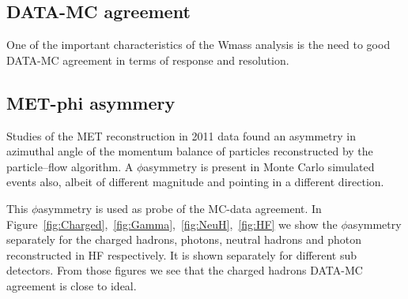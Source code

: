 \subsection{DATA-MC agreement}

One of the important characteristics of the Wmass analysis is the need to good DATA-MC agreement in terms of response and resolution.

\subsection{MET-phi asymmery}
Studies of the MET reconstruction in 2011 data found an asymmetry in azimuthal angle of the
 momentum balance of particles reconstructed by the particle–flow algorithm.
A $\phi$\–asymmetry is present in Monte Carlo simulated events also,
albeit of different magnitude and pointing in a different direction.

This $\phi$\–asymmetry is used as probe of the MC-data agreement.
In Figure~\ref{fig:Charged},~\ref{fig:Gamma},~\ref{fig:NeuH},~\ref{fig:HF} we show the $\phi$\–asymmetry separately for the
charged hadrons, photons, neutral hadrons and photon reconstructed in HF respectively.
It is shown separately for different sub detectors.
From those figures we see that the charged hadrons DATA-MC agreement is close to ideal.

